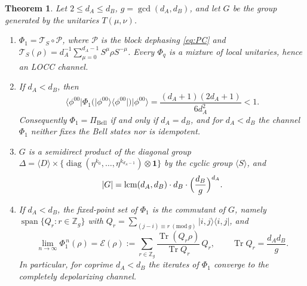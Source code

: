 \documentclass[11pt,a4paper]{article}
\newtheorem{theorem}{Theorem}
\theoremstyle{definition}
\theoremstyle{remark}
\newcommand{\ket}[1]{\lvert #1\rangle}
\newcommand{\bra}[1]{\langle #1\rvert}
\newcommand{\ketbra}[2]{\lvert #1\rangle\langle #2\rvert}
\newcommand{\dA}{d_A}
\newcommand{\dB}{d_B}
\newcommand{\PiB}{\Pi_{\mathrm{Bell}}}
\newcommand{\cP}{\mathcal{P}}
\newcommand{\cS}{\mathcal{T}_{S}}
\newcommand{\cE}{\mathcal{E}}
\newcommand{\tr}{\operatorname{Tr}}
\newcommand{\id}{\mathbf{1}}
\newcommand{\phib}[2]{\phi^{#1#2}}
\DeclareMathOperator{\lcm}{lcm}
\DeclareMathOperator{\spn}{span}
\begin{document}
\begin{theorem}\label{thm:phi}
Let $2\le\dA\le\dB$, $g=\gcd(\dA,\dB)$, and let $G$ be the group generated by the unitaries
$T(\mu,\nu)$.
\begin{enumerate}
\item[(i)] $\Phi_1=\cS\circ\cP$, where $\cP$ is the block dephasing \eqref{eq:PC} and
$\cS(\rho)=\dA^{-1}\sum_{\mu=0}^{\dA-1}S^{\mu}\rho S^{-\mu}$. Every $\Phi_q$ is a mixture
of local unitaries, hence an LOCC channel.
\item[(ii)] If $\dA<\dB$, then
\begin{equation}\label{eq:fid}
\bra{\phib00}\Phi_1\bigl(\ketbra{\phib00}{\phib00}\bigr)\ket{\phib00}
=\frac{(\dA+1)(2\dA+1)}{6\dA^{2}}<1 .
\end{equation}
Consequently $\Phi_1=\PiB$ if and only if $\dA=\dB$, and for $\dA<\dB$ the channel
$\Phi_1$ neither fixes the Bell states nor is idempotent.
\item[(iii)] $G$ is a semidirect product of the diagonal group
$\Delta=\langle D\rangle\times\{\operatorname{diag}(\eta^{k_0},\dots,\eta^{k_{\dA-1}})\otimes\id\}$
by the cyclic group $\langle S\rangle$, and
\begin{equation}\label{eq:order}
|G|=\lcm(\dA,\dB)\cdot\dB\cdot\Bigl(\frac{\dB}{g}\Bigr)^{\dA}.
\end{equation}
\item[(iv)] If $\dA<\dB$, the fixed-point set of $\Phi_1$ is the commutant of $G$, namely
$\spn\{Q_r: r\in\mathbb{Z}_g\}$ with
$Q_r=\sum_{(j-i)\equiv r\ (\mathrm{mod}\ g)}\ketbra{i,j}{i,j}$, and
\begin{equation}\label{eq:limit}
\lim_{n\to\infty}\Phi_1^{\,n}(\rho)=\cE(\rho):=\sum_{r\in\mathbb{Z}_g}
\frac{\tr(Q_r\rho)}{\tr Q_r}\,Q_r,\qquad \tr Q_r=\frac{\dA\dB}{g}.
\end{equation}
In particular, for coprime $\dA<\dB$ the iterates of $\Phi_1$ converge to the completely
depolarizing channel.
\end{enumerate}
\end{theorem}
\end{document}
